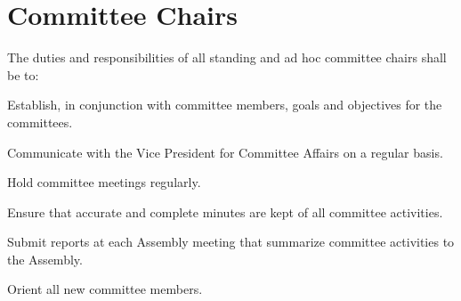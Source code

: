 \section{Committee Chairs}
The duties and responsibilities of all standing and ad hoc committee chairs shall be to:
\begin{bylaws-number}
  \item Establish, in conjunction with committee members, goals and objectives for the committees.
  \item Communicate with the Vice President for Committee Affairs on a regular basis.
  \item Hold committee meetings regularly.
  \item Ensure that accurate and complete minutes are kept of all committee activities.
  \item Submit reports at each Assembly meeting that summarize committee activities to the Assembly.
  \item Orient all new committee members.
\end{bylaws-number}
